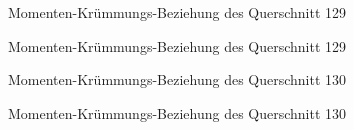 \documentclass[
  11pt,
  letterpaper,
]{scrreprt}
\begin{document}
\begin{figure}[H]


\caption{\label{fig-qs_129}Momenten-Krümmungs-Beziehung des Querschnitt
129}

\end{figure}%

\begin{figure}[H]


\caption{\label{fig-m_chi_129}Momenten-Krümmungs-Beziehung des
Querschnitt 129}

\end{figure}%

\begin{figure}[H]


\caption{\label{fig-qs_130}Momenten-Krümmungs-Beziehung des Querschnitt
130}

\end{figure}%

\begin{figure}[H]


\caption{\label{fig-m_chi_130}Momenten-Krümmungs-Beziehung des
Querschnitt 130}

\end{figure}%
\end{document}
